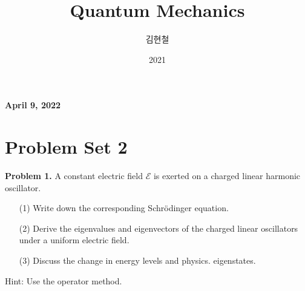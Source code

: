 \documentclass[floatfix,nofootinbib,superscriptaddress,fleqn]{revtex4}
\begin{document}
\title{\Large Quantum Mechanics}
\author{김현철}
\date{2021}

\maketitle

 \textbf{\color{red} April 9, 2022} \\ 
\vspace{2cm}

\section*{\large Problem Set 2}
\noindent \textbf{Problem 1.}
A constant electric field $\mathcal{E}$ is exerted on a charged linear
harmonic oscillator. 
\begin{itemize}
\item[(1)] Write down the corresponding Schr\"odinger equation. 
\item[(2)] Derive the eigenvalues and eigenvectors of the charged
  linear oscillators under a uniform electric field. 
\item[(3)] Discuss the change in energy levels and physics. 
  eigenstates. 
\end{itemize}
Hint: Use the operator method.
\vspace{0.5cm}
\end{document}
